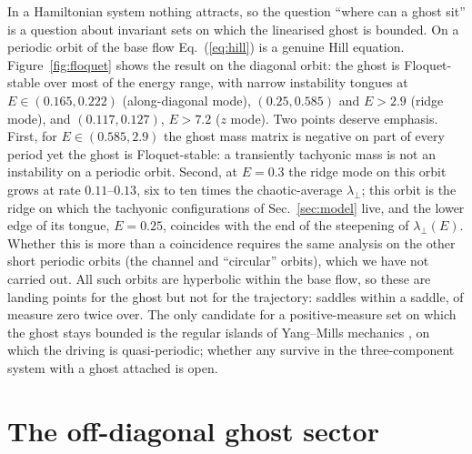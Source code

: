 \documentclass[11pt,a4paper]{article}
\begin{document}
In a Hamiltonian system nothing attracts, so the question ``where can a ghost sit'' is a question
about invariant sets on which the linearised ghost is bounded. On a periodic orbit of the base
flow Eq.~(\ref{eq:hill}) is a genuine Hill equation. Figure~\ref{fig:floquet} shows the result on
the diagonal orbit: the ghost is Floquet-stable over most of the energy range, with narrow
instability tongues at $E\in(0.165,0.222)$ (along-diagonal mode), $(0.25,0.585)$ and $E>2.9$
(ridge mode), and $(0.117,0.127)$, $E>7.2$ ($z$ mode). Two points deserve emphasis. First, for
$E\in(0.585,2.9)$ the ghost mass matrix is negative on part of every period yet the ghost is
Floquet-stable: a transiently tachyonic mass is not an instability on a periodic orbit. Second,
at $E=0.3$ the ridge mode on this orbit grows at rate $0.11$--$0.13$, six to ten times the
chaotic-average $\lambda_\perp$; this orbit is the ridge on which the tachyonic configurations of
Sec.~\ref{sec:model} live, and the lower edge of its tongue, $E=0.25$, coincides with the end of
the steepening of $\lambda_\perp(E)$. Whether this is more than a coincidence requires the same
analysis on the other short periodic orbits (the channel and ``circular'' orbits), which we have
not carried out. All such
orbits are hyperbolic within the base flow, so these are landing points for the ghost but not
for the trajectory: saddles within a saddle, of measure zero twice over. The only candidate for a
positive-measure set on which the ghost stays bounded is the regular islands of Yang--Mills
mechanics \cite{DahlqvistRussberg}, on which the driving is quasi-periodic; whether any survive in
the three-component system with a ghost attached is open.

\section{The off-diagonal ghost sector}
\label{sec:offdiag}
\end{document}
